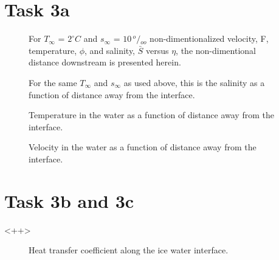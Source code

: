 \section*{Task 3a} %
\label{sec:Task 3a}
	
	\begin{figure}[h]
		\begin{center}
			\newlength\figureheight 
			\newlength\figurewidth 
			\setlength\figureheight{6cm} 
			\setlength\figurewidth{9cm} 
			
		\end{center}
		\caption{For $T_\infty$ = $2^\circ C$ and $s_\infty$ = $10 \, {}^o/{}_{oo}$ non-dimentionalized velocity, F, temperature, $\phi$, and salinity, $\bar{S}$ versus $\eta$, the non-dimentional distance downstream is presented herein.}
		\label{fig:etaVsF_phi_S_3a}
	\end{figure}
	
	\begin{figure}[h]
		\begin{center}
			\setlength\figureheight{6cm} 
			\setlength\figurewidth{9cm} 
			
		\end{center}
		\caption{For the same $T_\infty$ and $s_\infty$ as used above, this is the salinity as a function of distance away from the interface.}
		\label{fig:salinity_3a}
	\end{figure}
	
	\begin{figure}[h]
		\begin{center}
			\setlength\figureheight{6cm} 
			\setlength\figurewidth{9cm} 
			
		\end{center}
		\caption{Temperature in the water as a function of distance away from the interface.}
		\label{fig:temperture_3a}
	\end{figure}
	
	\begin{figure}[h]
		\begin{center}
			\setlength\figureheight{6cm} 
			\setlength\figurewidth{9cm} 
			
		\end{center}
		\caption{Velocity in the water as a function of distance away from the interface.}
		\label{fig:salinity_3a}
	\end{figure}
	
\section*{Task 3b and 3c}<++>
	\begin{figure}[h]
		\begin{center}
			\setlength\figureheight{6cm} 
			\setlength\figurewidth{9cm} 
			
		\end{center}
		\caption{Heat transfer coefficient along the ice water interface.}
		\label{fig:temperture_3a}
	\end{figure}
	
